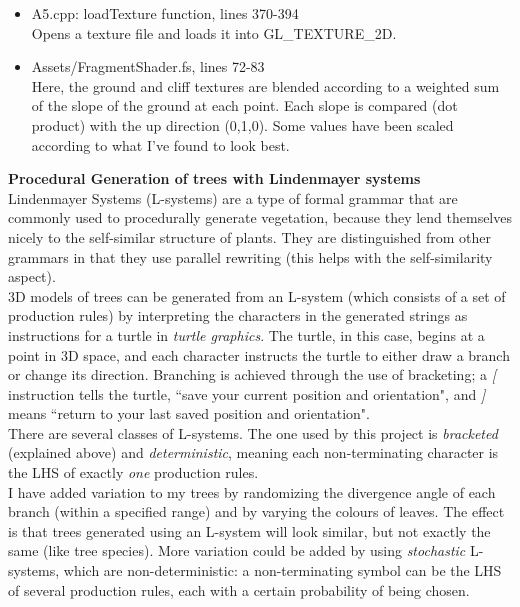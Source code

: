 \documentclass{article}
\begin{document}
	\begin{itemize}
	\item A5.cpp: loadTexture function, lines 370-394 \\
	Opens a texture file and loads it into GL\_TEXTURE\_2D.
	\item Assets/FragmentShader.fs, lines 72-83 \\
	Here, the ground and cliff textures are blended according to a weighted sum of the slope of the ground at each point. Each slope is compared (dot product) with the up direction (0,1,0). Some values have been scaled according to what I've found to look best.
	\end{itemize}

	\large\noindent\textbf{Procedural Generation of trees with Lindenmayer systems}
	\normalsize
	\\

	Lindenmayer Systems (L-systems) are a type of formal grammar that are commonly used to procedurally generate vegetation, because they lend themselves nicely to the self-similar structure of plants. They are distinguished from other grammars in that they use parallel rewriting (this helps with the self-similarity aspect).
	\\

	3D models of trees can be generated from an L-system (which consists of a set of production rules) by interpreting the characters in the generated strings as instructions for a turtle in \textit{turtle graphics}. The turtle, in this case, begins at a point in 3D space, and each character instructs the turtle to either draw a branch or change its direction. Branching is achieved through the use of bracketing; a \textit{[} instruction tells the turtle, ``save your current position and orientation", and \textit{]} means ``return to your last saved position and orientation".
	\\

	There are several classes of L-systems. The one used by this project is \textit{bracketed} (explained above) and \textit{deterministic}, meaning each non-terminating character is the LHS of exactly \textit{one} production rules.
	\\

	I have added variation to my trees by randomizing the divergence angle of each branch (within a specified range) and by varying the colours of leaves. The effect is that trees generated using an L-system will look similar, but not exactly the same (like tree species). More variation could be added by using \textit{stochastic} L-systems, which are non-deterministic: a non-terminating symbol can be the LHS of several production rules, each with a certain probability of being chosen.
	\\
\end{document}
